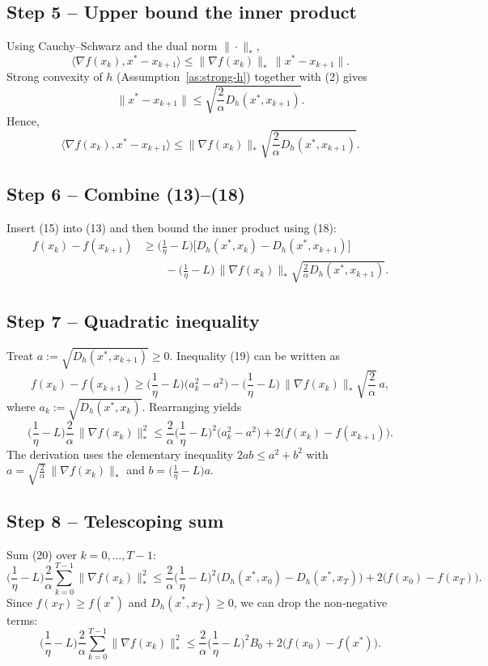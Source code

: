 \documentclass[11pt]{article}
\newcommand{\inner}[2]{\langle #1,#2\rangle}
\newcommand{\grad}{\nabla}
\begin{document}
\subsection*{Step 5 – Upper bound the inner product}
Using Cauchy–Schwarz and the dual norm $\|\cdot\|_{*}$,
\[
\inner{\grad f(x_{k})}{x^{*}-x_{k+1}}
\le \|\grad f(x_{k})\|_{*}\,\|x^{*}-x_{k+1}\|. \tag{16}
\]
Strong convexity of $h$ (Assumption~\ref{as:strong-h}) together with (2) gives
\[
\|x^{*}-x_{k+1}\|\le \sqrt{\frac{2}{\alpha} D_{h}(x^{*},x_{k+1})}. \tag{17}
\]
Hence,
\[
\inner{\grad f(x_{k})}{x^{*}-x_{k+1}}
\le \|\grad f(x_{k})\|_{*}\sqrt{\frac{2}{\alpha} D_{h}(x^{*},x_{k+1})}. \tag{18}
\]

\subsection*{Step 6 – Combine (13)–(18)}
Insert (15) into (13) and then bound the inner product using (18):
\[
\begin{aligned}
f(x_{k})-f(x_{k+1})
&\ge \Big(\frac{1}{\eta}-L\Big)\Big[ D_{h}(x^{*},x_{k})-D_{h}(x^{*},x_{k+1})\Big]\\
&\qquad -\Big(\frac{1}{\eta}-L\Big)\,\|\grad f(x_{k})\|_{*}\sqrt{\frac{2}{\alpha} D_{h}(x^{*},x_{k+1})}. \tag{19}
\end{aligned}
\]

\subsection*{Step 7 – Quadratic inequality}
Treat $a:=\sqrt{D_{h}(x^{*},x_{k+1})}\ge0$. Inequality (19) can be written as
\[
f(x_{k})-f(x_{k+1})\ge
\Big(\frac{1}{\eta}-L\Big)\big( a_{k}^{2}-a^{2}\big)
-\Big(\frac{1}{\eta}-L\Big)\,\|\grad f(x_{k})\|_{*}\sqrt{\frac{2}{\alpha}}\,a,
\]
where $a_{k}:=\sqrt{D_{h}(x^{*},x_{k})}$. Rearranging yields
\[
\Big(\frac{1}{\eta}-L\Big)\frac{2}{\alpha}\,\|\grad f(x_{k})\|_{*}^{2}
\le
\frac{2}{\alpha}\Big(\frac{1}{\eta}-L\Big)^{2}\big(a_{k}^{2}-a^{2}\big)
+2\big(f(x_{k})-f(x_{k+1})\big). \tag{20}
\]
The derivation uses the elementary inequality $2ab\le a^{2}+b^{2}$ with $a=\sqrt{\tfrac{2}{\alpha}}\,\|\grad f(x_{k})\|_{*}$ and $b=\Big(\frac{1}{\eta}-L\Big)a$.

\subsection*{Step 8 – Telescoping sum}
Sum (20) over $k=0,\dots,T-1$:
\[
\Big(\frac{1}{\eta}-L\Big)\frac{2}{\alpha}\sum_{k=0}^{T-1}\|\grad f(x_{k})\|_{*}^{2}
\le
\frac{2}{\alpha}\Big(\frac{1}{\eta}-L\Big)^{2}\big(D_{h}(x^{*},x_{0})-D_{h}(x^{*},x_{T})\big)
+2\big(f(x_{0})-f(x_{T})\big). \tag{21}
\]
Since $f(x_{T})\ge f(x^{*})$ and $D_{h}(x^{*},x_{T})\ge0$, we can drop the non‑negative terms:
\[
\Big(\frac{1}{\eta}-L\Big)\frac{2}{\alpha}\sum_{k=0}^{T-1}\|\grad f(x_{k})\|_{*}^{2}
\le
\frac{2}{\alpha}\Big(\frac{1}{\eta}-L\Big)^{2} B_{0}+2\big(f(x_{0})-f(x^{*})\big). \tag{22}
\]
\end{document}
